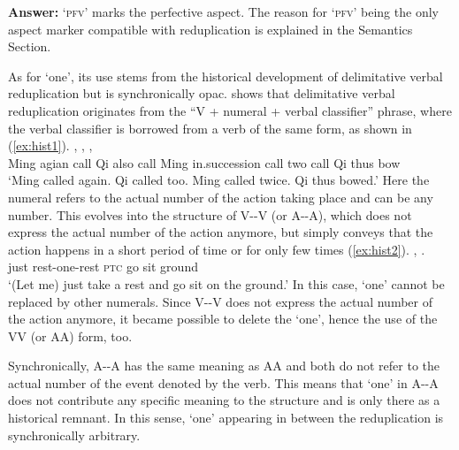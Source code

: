\documentclass[fleqn,twoside]{article}
\begin{document}
\begin{enumerate}
\textbf{Answer:}
 `\textsc{pfv}' marks the perfective aspect.
The reason for  `\textsc{pfv}' being the only aspect marker compatible with reduplication is explained in the Semantics Section.

As for  `one', its use stems from the historical development of delimitative verbal reduplication but is synchronically opac.
\citet[13--15]{Zhang2000} shows that delimitative verbal reduplication originates from the ``V + numeral + verbal classifier'' phrase,
where the verbal classifier is borrowed from a verb of the same form, as shown in (\ref{ex:hist1}).
\ea\label{ex:hist1}
\gll {}  ,   ,     ,   \footnotemark\\
Ming agian call Qi also call Ming in.succession call two call Qi thus bow\\
\glt `Ming called again. Qi called too. Ming called twice. Qi thus bowed.'
\z
{}
Here the numeral refers to the actual number of the action taking place
and can be any number.
This evolves into the structure of V--V (or A--A), which does not express the actual number of the action anymore,
but simply conveys that the action happens in a short period of time or for only few times (\ref{ex:hist2}).
\ea\label{ex:hist2}
\gll {}  ,   .\footnotemark\\
just rest-one-rest \textsc{ptc} go sit ground\\
\glt `(Let me) just take a rest and go sit on the ground.'
\z
{}
In this case,  `one' cannot be replaced by other numerals.
Since V--V does not express the actual number of the action anymore,
it became possible to delete the  `one',
hence the use of the VV (or AA) form, too.

Synchronically, A--A has the same meaning as AA and both do not refer to the actual number of the event denoted by the verb.
This means that  `one' in A--A does not contribute any specific meaning to the structure
and is only there as a historical remnant.
In this sense,   `one' appearing in between the reduplication is synchronically arbitrary. %


\end{enumerate}
\end{document}
